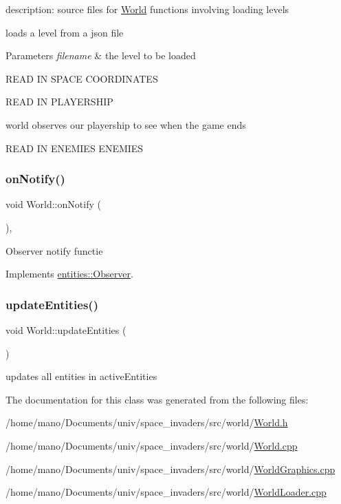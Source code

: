 description\+: source files for \hyperlink{classWorld}{World} functions involving loading levels 

loads a level from a json file 
\begin{DoxyParams}{Parameters}
{\em filename} & the level to be loaded \\
\hline
\end{DoxyParams}
R\+E\+AD IN S\+P\+A\+CE C\+O\+O\+R\+D\+I\+N\+A\+T\+ES

R\+E\+AD IN P\+L\+A\+Y\+E\+R\+S\+H\+IP

world observes our playership to see when the game ends

R\+E\+AD IN E\+N\+E\+M\+I\+ES E\+N\+E\+M\+I\+ES \mbox{\label{classWorld_a91c2d7b127190f17a6cd85743245fb5b}} 
\subsubsection{\texorpdfstring{on\+Notify()}{onNotify()}}
{\footnotesize\ttfamily void World\+::on\+Notify (\begin{DoxyParamCaption}{ }\end{DoxyParamCaption})\hspace{0.3cm}{\ttfamily [override]}, {\ttfamily [virtual]}}

Observer notify functie 

Implements \hyperlink{classentities_1_1Observer}{entities\+::\+Observer}.

\mbox{\label{classWorld_a5cc73b1aa54db5da01e4004acd4fd8bb}} 
\subsubsection{\texorpdfstring{update\+Entities()}{updateEntities()}}
{\footnotesize\ttfamily void World\+::update\+Entities (\begin{DoxyParamCaption}{ }\end{DoxyParamCaption})}

updates all entities in active\+Entities 

The documentation for this class was generated from the following files\+:\begin{DoxyCompactItemize}
\item 
/home/mano/\+Documents/univ/space\+\_\+invaders/src/world/\hyperlink{World_8h}{World.\+h}\item 
/home/mano/\+Documents/univ/space\+\_\+invaders/src/world/\hyperlink{World_8cpp}{World.\+cpp}\item 
/home/mano/\+Documents/univ/space\+\_\+invaders/src/world/\hyperlink{WorldGraphics_8cpp}{World\+Graphics.\+cpp}\item 
/home/mano/\+Documents/univ/space\+\_\+invaders/src/world/\hyperlink{WorldLoader_8cpp}{World\+Loader.\+cpp}\end{DoxyCompactItemize}
